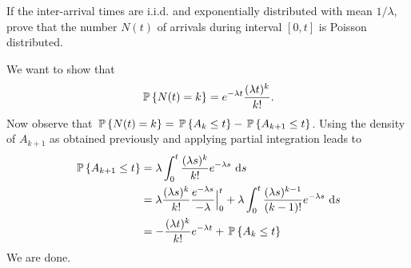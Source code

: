 \begin{question}
  If the inter-arrival times are i.i.d. and exponentially distributed
  with mean $1/\lambda$, prove that the number $N(t)$ of arrivals
  during interval $[0,t]$ is Poisson distributed.
    \begin{solution}
      We want to show that
    \begin{equation*}
      \P{N(t)=k} = e^{-\lambda t}\frac{(\lambda t)^k}{k!}.
    \end{equation*}
    Now observe that
    $\P{N(t)=k} = \P{A_k \leq t} - \P{A_{k+1} \leq t}$.  Using the
    density of $A_{k+1}$ as obtained previously and applying partial
    integration leads to
\begin{equation*}
  \begin{split}
\P{A_{k+1} \leq t} 
&= \lambda \int_0^t \frac{(\lambda s)^{k}}{k!}e^{-\lambda s}\, \d s \\
&= \lambda \frac{(\lambda s)^{k}}{k!}\frac{e^{-\lambda s}}{-\lambda} \Big|_{0}^t + \lambda \int_0^t \frac{(\lambda s)^{k-1}}{(k-1)!}e^{-\lambda s}\, \d s \\
&= - \frac{(\lambda t)^{k}}{k!} e^{-\lambda t} + \P{A_k \leq t}
  \end{split}
\end{equation*}
We are done.
    \end{solution}
\end{question}



